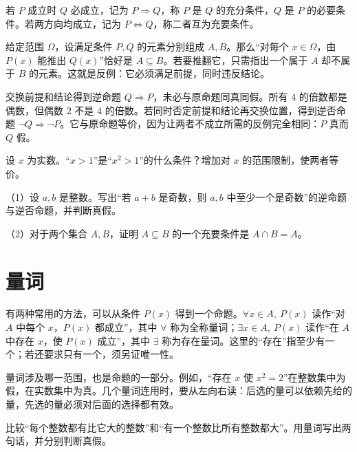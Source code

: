 \begin{definition}
若 \(P\) 成立时 \(Q\) 必成立，记为 \(P\Rightarrow Q\)，称 \(P\) 是 \(Q\) 的{\heiti{}充分条件}，\(Q\) 是 \(P\) 的{\heiti{}必要条件}。若两方向均成立，记为 \(P\Leftrightarrow Q\)，称二者互为{\heiti{}充要条件}。
\end{definition}
给定范围 \(\Omega\)，设满足条件 \(P,Q\) 的元素分别组成 \(A,B\)。那么“对每个 \(x\in\Omega\)，由 \(P(x)\) 能推出 \(Q(x)\)”恰好是 \(A\subseteq B\)。若要推翻它，只需指出一个属于 \(A\) 却不属于 \(B\) 的元素。这就是{\heiti{}反例}：它必须满足前提，同时违反结论。

交换前提和结论得到{\heiti{}逆命题} \(Q\Rightarrow P\)，未必与原命题同真同假。所有 \(4\) 的倍数都是偶数，但偶数 \(2\) 不是 \(4\) 的倍数。若同时否定前提和结论再交换位置，得到{\heiti{}逆否命题} \(\neg Q\Rightarrow\neg P\)。它与原命题等价，因为让两者不成立所需的反例完全相同：\(P\) 真而 \(Q\) 假。

\begin{example}
设 \(x\) 为实数。“\(x>1\)”是“\(x^2>1\)”的什么条件？增加对 \(x\) 的范围限制，使两者等价。
\end{example}

\begin{exercise}
\mbox{}\par\nobreak

（1）设 \(a,b\) 是整数。写出“若 \(a+b\) 是奇数，则 \(a,b\) 中至少一个是奇数”的逆命题与逆否命题，并判断真假。

（2）对于两个集合 \(A,B\)，证明 \(A\subseteq B\) 的一个充要条件是 \(A\cap B=A\)。
\end{exercise}

\section{量词}
有两种常用的方法，可以从条件 \(P(x)\) 得到一个命题。\(\forall x\in A,\ P(x)\) 读作“对 \(A\) 中每个 \(x\)，\(P(x)\) 都成立”，其中 \(\forall\) 称为{\heiti{}全称量词}；\(\exists x\in A,\ P(x)\) 读作“在 \(A\) 中存在 \(x\)，使 \(P(x)\) 成立”，其中 \(\exists\) 称为{\heiti{}存在量词}。这里的“存在”指至少有一个；若还要求只有一个，须另证唯一性。

量词涉及哪一范围，也是命题的一部分。例如，“存在 \(x\) 使 \(x^2=2\)”在整数集中为假，在实数集中为真。几个量词连用时，要从左向右读：后选的量可以依赖先给的量，先选的量必须对后面的选择都有效。

\begin{example}
比较“每个整数都有比它大的整数”和“有一个整数比所有整数都大”。用量词写出两句话，并分别判断真假。
\end{example}

